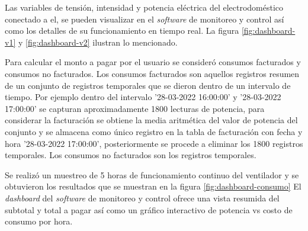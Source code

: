 Las variables de tensión, intensidad y potencia eléctrica del electrodoméstico conectado a el, se pueden visualizar en el \emph{software} de monitoreo y control así como los detalles de su funcionamiento en tiempo real. La figura \ref{fig:dashboard-v1} y \ref{fig:dashboard-v2} ilustran lo mencionado.

Para calcular el monto a pagar por el usuario se consideró consumos facturados y consumos no facturados. Los consumos facturados son aquellos registros resumen de un conjunto de registros temporales que se dieron dentro de un intervalo de tiempo. Por ejemplo dentro del intervalo '28-03-2022 16:00:00' y '28-03-2022 17:00:00' se capturan aproximadamente 1800 lecturas de potencia, para considerar la facturación se obtiene la media aritmética del valor de potencia del conjunto y se almacena como único registro en la tabla de facturación con fecha y hora '28-03-2022 17:00:00', posteriormente se procede a eliminar los 1800 registros temporales. Los consumos no facturados son los registros temporales. 

Se realizó un muestreo de 5 horas de funcionamiento continuo del ventilador y se obtuvieron los resultados que se muestran en la figura \ref{fig:dashboard-consumo} El \emph{dashboard} del \emph{software} de monitoreo y control ofrece una vista resumida del subtotal y total a pagar así como un gráfico interactivo de potencia vs costo de consumo por hora.

